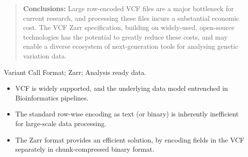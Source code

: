 \documentclass[a4paper,num-refs]{oup-contemporary}
\begin{document}
\begin{frontmatter}
\begin{abstract}
\textbf{Conclusions:}
Large row-encoded VCF files are a major bottleneck for current research, and 
processing these files incurs a substantial economic cost.
The VCF Zarr specification, building on widely-used, open-source technologies
has the potential to greatly reduce these costs,
and may enable a diverse ecosystem of next-generation tools for analysing 
genetic variation data.
\end{abstract}

\begin{keywords}
Variant Call Format; Zarr; Analysis ready data.
\end{keywords}
\end{frontmatter}

\begin{keypoints*}
\begin{itemize}
\item VCF is widely supported, and the underlying data model entrenched 
in Bioinformatics pipelines.
\item The standard row-wise encoding as text (or binary) is inherently
inefficient for large-scale data processing.
\item The Zarr format provides an efficient solution, by encoding fields
in the VCF separately in chunk-compressed binary format.
\end{itemize}
\end{keypoints*}
\end{document}
